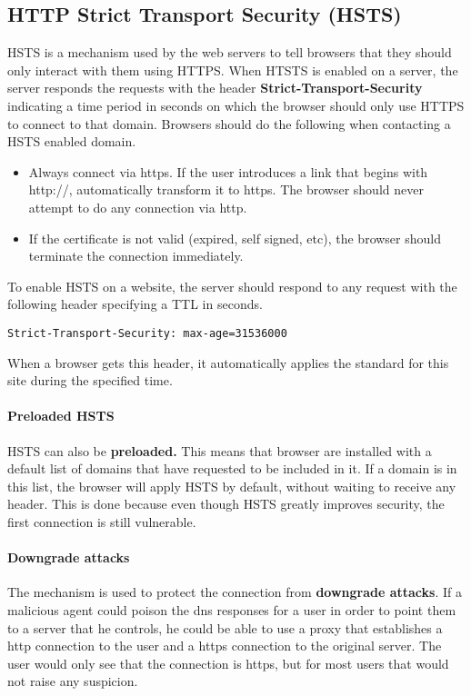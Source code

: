 \subsection{HTTP Strict Transport Security (HSTS)} 
HSTS is a mechanism used by the web servers to tell browsers that they should only interact with them using HTTPS. When HTSTS is enabled on a server, the server responds the requests with the header \textbf{Strict-Transport-Security} indicating a time period in seconds on which the browser should only use HTTPS to connect to that domain. Browsers should do the following when contacting a HSTS enabled domain.
\begin{itemize}
	\item Always connect via https. If the user introduces a link that begins with http://, automatically transform it to https. The browser should never attempt to do any connection via http.
	\item If the certificate is not valid (expired, self signed, etc), the browser should terminate the connection immediately.
\end{itemize}

To enable HSTS on a website, the server should respond to any request with the following header specifying a TTL in seconds.
\begin{lstlisting}[style=verbs]
Strict-Transport-Security: max-age=31536000
\end{lstlisting}
When a browser gets this header, it automatically applies the standard for this site during the specified time.

\paragraph{Preloaded HSTS}
HSTS can also be \textbf{preloaded.} This means that browser are installed with a default list of domains that have requested to be included in it. If a domain is in this list, the browser will apply HSTS by default, without waiting to receive any header. This is done because even though HSTS greatly improves security, the first connection is still vulnerable.

\paragraph{Downgrade attacks}
The mechanism is used to protect the connection from \textbf{downgrade attacks}. If a malicious agent could poison the dns responses for a user in order to point them to a server that he controls, he could be able to use a proxy that establishes a http connection to the user and a https connection to the original server. The user would only see that the connection is https, but for most users that would not raise any suspicion.

